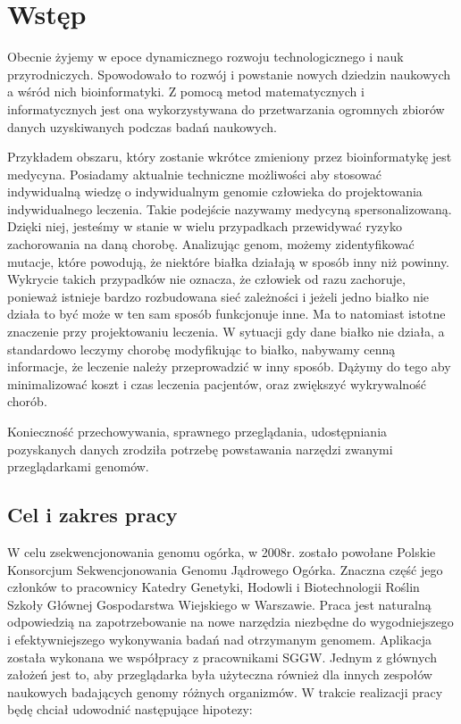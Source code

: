 
\chapter{Wstęp}
\label{section:wstep}

Obecnie żyjemy w epoce dynamicznego rozwoju technologicznego i nauk przyrodniczych. Spowodowało to rozwój i powstanie nowych dziedzin naukowych a wśród nich bioinformatyki. Z pomocą metod matematycznych i informatycznych jest ona wykorzystywana do przetwarzania ogromnych zbiorów danych uzyskiwanych podczas badań naukowych. 

Przykładem obszaru, który zostanie wkrótce zmieniony przez bioinformatykę jest medycyna.
Posiadamy aktualnie techniczne możliwości aby stosować indywidualną wiedzę o indywidualnym genomie człowieka do projektowania indywidualnego leczenia.
Takie podejście nazywamy medycyną spersonalizowaną.
Dzięki niej, jesteśmy w stanie w wielu przypadkach przewidywać ryzyko zachorowania na daną chorobę.
Analizując genom, możemy zidentyfikować mutacje, które powodują, że niektóre białka działają w sposób inny niż powinny.
Wykrycie takich przypadków nie oznacza, że człowiek od razu zachoruje, ponieważ istnieje bardzo rozbudowana sieć zależności i jeżeli jedno białko nie działa to być może w ten sam sposób funkcjonuje inne.
Ma to natomiast istotne znaczenie przy projektowaniu leczenia.
W sytuacji gdy dane białko nie działa, a standardowo leczymy chorobę modyfikując to białko, nabywamy cenną informacje, że leczenie należy przeprowadzić w inny sposób.
Dążymy do tego aby minimalizować koszt i czas leczenia pacjentów, oraz zwiększyć wykrywalność chorób.

Konieczność przechowywania, sprawnego przeglądania, udostępniania pozyskanych danych zrodziła potrzebę powstawania narzędzi zwanymi przeglądarkami genomów.

\section{Cel i zakres pracy}
\label{section:cel_i_zakres_pracy}
W celu zsekwencjonowania genomu ogórka, w 2008r. zostało powołane Polskie Konsorcjum Sekwencjonowania Genomu Jądrowego Ogórka.
Znaczna część jego członków to pracownicy Katedry Genetyki, Hodowli i Biotechnologii Roślin Szkoły Głównej Gospodarstwa Wiejskiego w Warszawie.
Praca jest naturalną odpowiedzią na zapotrzebowanie na nowe narzędzia niezbędne do wygodniejszego i efektywniejszego  wykonywania badań nad otrzymanym genomem.
Aplikacja została wykonana we współpracy z pracownikami SGGW.
Jednym z głównych założeń jest to, aby przeglądarka była użyteczna również dla innych zespołów naukowych badających genomy różnych organizmów.
W trakcie realizacji pracy będę chciał udowodnić następujące hipotezy:

